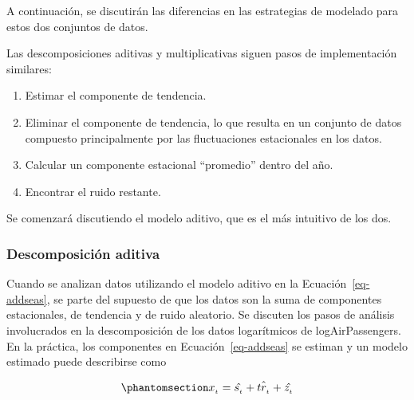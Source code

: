 \documentclass[
  us-letterpaper,
]{scrreprt}
\providecommand{\tightlist}{%
  \setlength{\itemsep}{0pt}\setlength{\parskip}{0pt}}\usepackage{longtable,booktabs,array}
\theoremstyle{plain}
\theoremstyle{definition}
\theoremstyle{plain}
\theoremstyle{definition}
\theoremstyle{remark}
\begin{document}
A continuación, se discutirán las diferencias en las estrategias de
modelado para estos dos conjuntos de datos.

Las descomposiciones aditivas y multiplicativas siguen pasos de
implementación similares:

\begin{enumerate}
\def\labelenumi{\arabic{enumi}.}
\tightlist
\item
  Estimar el componente de tendencia.
\item
  Eliminar el componente de tendencia, lo que resulta en un conjunto de
  datos compuesto principalmente por las fluctuaciones estacionales en
  los datos.
\item
  Calcular un componente estacional ``promedio'' dentro del año.
\item
  Encontrar el ruido restante.
\end{enumerate}

Se comenzará discutiendo el modelo aditivo, que es el más intuitivo de
los dos.

\subsubsection{Descomposición aditiva}\label{descomposiciuxf3n-aditiva}

Cuando se analizan datos utilizando el modelo aditivo en la
Ecuación~\ref{eq-addseas}, se parte del supuesto de que los datos son la
suma de componentes estacionales, de tendencia y de ruido aleatorio. Se
discuten los pasos de análisis involucrados en la descomposición de los
datos logarítmicos de logAirPassengers. En la práctica, los componentes
en Ecuación~\ref{eq-addseas} se estiman y un modelo estimado puede
describirse como

\begin{equation}\phantomsection\label{eq-addecompose}{
x_{_t}=\hat{s_{_t}}+\hat{tr_{_t}}+\hat{z_{_t}}
}\end{equation}
\end{document}
